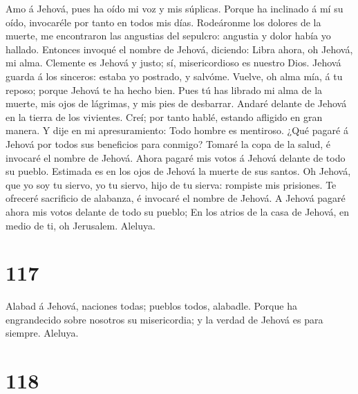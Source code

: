  Amo á Jehová, pues ha oído mi voz y mis súplicas.
 Porque ha inclinado á mí su oído, invocaréle por tanto en
todos mis días.  Rodeáronme los dolores de la muerte, me
encontraron las angustias del sepulcro: angustia y dolor había yo
hallado.  Entonces invoqué el nombre de Jehová, diciendo:
Libra ahora, oh Jehová, mi alma.  Clemente es Jehová y
justo; sí, misericordioso es nuestro Dios.  Jehová guarda á
los sinceros: estaba yo postrado, y salvóme.  Vuelve, oh
alma mía, á tu reposo; porque Jehová te ha hecho bien.  Pues
tú has librado mi alma de la muerte, mis ojos de lágrimas, y mis pies de
desbarrar.  Andaré delante de Jehová en la tierra de los
vivientes.  Creí; por tanto hablé, estando afligido en gran
manera.  Y dije en mi apresuramiento: Todo hombre es
mentiroso.  ¿Qué pagaré á Jehová por todos sus beneficios
para conmigo?  Tomaré la copa de la salud, é invocaré el
nombre de Jehová.  Ahora pagaré mis votos á Jehová delante
de todo su pueblo.  Estimada es en los ojos de Jehová la
muerte de sus santos.  Oh Jehová, que yo soy tu siervo, yo
tu siervo, hijo de tu sierva: rompiste mis prisiones.  Te
ofreceré sacrificio de alabanza, é invocaré el nombre de Jehová.
 A Jehová pagaré ahora mis votos delante de todo su pueblo;
 En los atrios de la casa de Jehová, en medio de ti, oh
Jerusalem. Aleluya.

\hypertarget{section-116}{%
\section{117}\label{section-116}}

 Alabad á Jehová, naciones todas; pueblos todos, alabadle.
 Porque ha engrandecido sobre nosotros su misericordia; y la
verdad de Jehová es para siempre. Aleluya.

\hypertarget{section-117}{%
\section{118}\label{section-117}}

